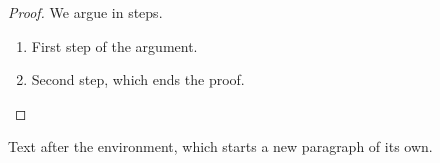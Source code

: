\documentclass[12pt]{article}
\begin{document}
\begin{proof}
We argue in steps.
\begin{enumerate}
\item First step of the argument.
\item Second step, which ends the proof. \qedhere
\end{enumerate}
\end{proof}
Text after the environment, which starts a new paragraph of its own.
\end{document}
